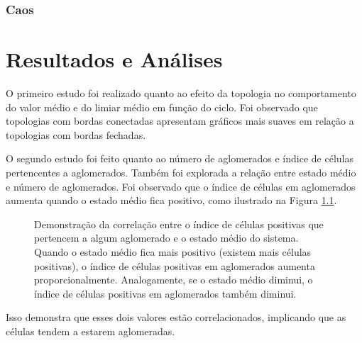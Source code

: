 \documentclass[
	12pt,				%
	openright,			%
	twoside,			%
	a4paper,			%
	english,			%
	french,				%
	spanish,			%
	brazil				%
	]{abntex2}
\begin{document}
\subsection{Caos}


\chapter{Resultados e Análises}

O primeiro estudo foi realizado quanto ao efeito da topologia no comportamento do valor médio e do limiar médio em função do ciclo. Foi observado que topologias com bordas conectadas apresentam gráficos mais suaves em relação a topologias com bordas fechadas. %

%

O segundo estudo foi feito quanto ao número de aglomerados e índice de células pertencentes a aglomerados. Também foi explorada a relação entre estado médio e número de aglomerados. Foi observado que o índice de células em aglomerados aumenta quando o estado médio fica positivo, como ilustrado na Figura \ref{fig:dataL2000Q100CellInClusterAvgStateVsCycle}. 
\begin{figure}[h]
    \centering
    \caption{Demonstração da correlação entre o índice de células positivas que pertencem a algum aglomerado e o estado médio do sistema. Quando o estado médio fica mais positivo (existem mais células positivas), o índice de células positivas em aglomerados aumenta proporcionalmente. Analogamente, se o estado médio diminui, o índice de células positivas em aglomerados também diminui.}
    \label{fig:dataL2000Q100CellInClusterAvgStateVsCycle}
\end{figure}
Isso demonstra que esses dois valores estão correlacionados, implicando que as células tendem a estarem aglomeradas. 
\end{document}
